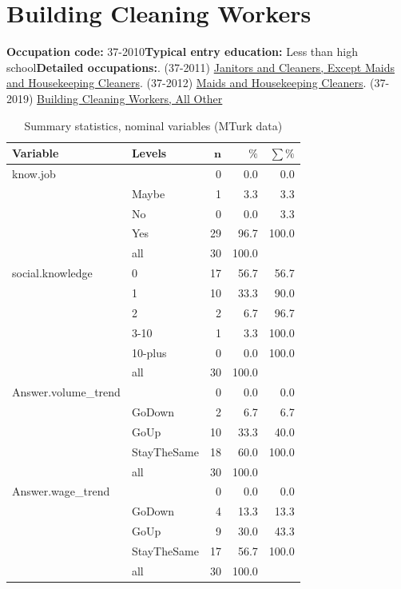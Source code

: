 \documentclass[a4paper,10pt]{article}\usepackage[]{graphicx}\usepackage[]{color}
\begin{document}
\newpage\section{Building Cleaning Workers}\textbf{Occupation code:} 37-2010\newline\textbf{Typical entry education:} Less than high school\newline\textbf{Detailed occupations:}. (37-2011)  \href{http://www.bls.gov/oes/current/oes372011.htm}{Janitors and Cleaners, Except Maids and Housekeeping Cleaners}. (37-2012)  \href{http://www.bls.gov/oes/current/oes372012.htm}{Maids and Housekeeping Cleaners}. (37-2019)  \href{http://www.bls.gov/oes/current/oes372019.htm}{Building Cleaning Workers, All Other}\newline%
\begin{table}[ht]
\centering
{\footnotesize
\begin{tabular}{ll|rrr}
 \textbf{Variable} & \textbf{Levels} & $\mathbf{n}$ & $\mathbf{\%}$ & $\mathbf{\sum \%}$ \\ 
  \hline
know.job &  & 0 & 0.0 & 0.0 \\ 
   & Maybe & 1 & 3.3 & 3.3 \\ 
   & No & 0 & 0.0 & 3.3 \\ 
   & Yes & 29 & 96.7 & 100.0 \\ 
   \hline
 & all & 30 & 100.0 &  \\ 
   \hline
\hline
social.knowledge & 0 & 17 & 56.7 & 56.7 \\ 
   & 1 & 10 & 33.3 & 90.0 \\ 
   & 2 & 2 & 6.7 & 96.7 \\ 
   & 3-10 & 1 & 3.3 & 100.0 \\ 
   & 10-plus & 0 & 0.0 & 100.0 \\ 
   \hline
 & all & 30 & 100.0 &  \\ 
   \hline
\hline
Answer.volume\_trend &  & 0 & 0.0 & 0.0 \\ 
   & GoDown & 2 & 6.7 & 6.7 \\ 
   & GoUp & 10 & 33.3 & 40.0 \\ 
   & StayTheSame & 18 & 60.0 & 100.0 \\ 
   \hline
 & all & 30 & 100.0 &  \\ 
   \hline
\hline
Answer.wage\_trend &  & 0 & 0.0 & 0.0 \\ 
   & GoDown & 4 & 13.3 & 13.3 \\ 
   & GoUp & 9 & 30.0 & 43.3 \\ 
   & StayTheSame & 17 & 56.7 & 100.0 \\ 
   \hline
 & all & 30 & 100.0 &  \\ 
   \hline
\hline
\end{tabular}
}
\caption{Summary statistics, nominal variables (MTurk data)} 
\label{tab1:37-2010}
\end{table}
\end{document}
